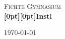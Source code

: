 \begin{titlepage}

\begin{center}



\textsc{\LARGE Fichte Gymnasium}\\[1.5cm]




{ \huge \bfseries \ttfamily \raisebox{0pt}[0pt][0pt]{Inst\/\raisebox{-0.2ex}{A}\raisebox{-0.4ex}{B}\raisebox{0.2ex}{I}\/l}}




\vfill

{\large \today}

\end{center}

\end{titlepage}
